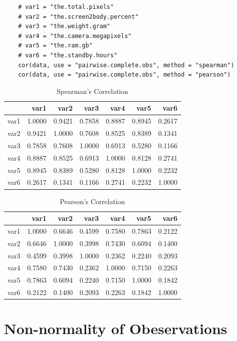 \documentclass[utf8,english]{gradu3}
\begin{document}
\begin{verbatim}
    # var1 = "the.total.pixels"
    # var2 = "the.screen2body.percent"
    # var3 = "the.weight.gram"
    # var4 = "the.camera.megapixels"
    # var5 = "the.ram.gb"
    # var6 = "the.standby.hours"
    cor(data, use = "pairwise.complete.obs", method = "spearman")
    cor(data, use = "pairwise.complete.obs", method = "pearson")
\end{verbatim}

\begin{table}[ht]
\caption{Spearman's Correlation}
\centering
\begin{tabular}{rrrrrrr}
  \hline
 & var1 & var2 & var3 & var4 & var5 & var6 \\ 
  \hline
var1 & 1.0000 & 0.9421 & 0.7858 & 0.8887 & 0.8945 & 0.2617 \\ 
  var2 & 0.9421 & 1.0000 & 0.7608 & 0.8525 & 0.8389 & 0.1341 \\ 
  var3 & 0.7858 & 0.7608 & 1.0000 & 0.6913 & 0.5280 & 0.1166 \\ 
  var4 & 0.8887 & 0.8525 & 0.6913 & 1.0000 & 0.8128 & 0.2741 \\ 
  var5 & 0.8945 & 0.8389 & 0.5280 & 0.8128 & 1.0000 & 0.2232 \\ 
  var6 & 0.2617 & 0.1341 & 0.1166 & 0.2741 & 0.2232 & 1.0000 \\ 
   \hline
\end{tabular}
\end{table}

\begin{table}[ht]
\caption{Pearson's Correlation}
\centering
\begin{tabular}{rrrrrrr}
  \hline
 & var1 & var2 & var3 & var4 & var5 & var6 \\ 
  \hline
var1 & 1.0000 & 0.6646 & 0.4599 & 0.7580 & 0.7863 & 0.2122 \\ 
  var2 & 0.6646 & 1.0000 & 0.3998 & 0.7430 & 0.6094 & 0.1400 \\ 
  var3 & 0.4599 & 0.3998 & 1.0000 & 0.2362 & 0.2240 & 0.2093 \\ 
  var4 & 0.7580 & 0.7430 & 0.2362 & 1.0000 & 0.7150 & 0.2263 \\ 
  var5 & 0.7863 & 0.6094 & 0.2240 & 0.7150 & 1.0000 & 0.1842 \\ 
  var6 & 0.2122 & 0.1400 & 0.2093 & 0.2263 & 0.1842 & 1.0000 \\ 
   \hline
\end{tabular}
\end{table}

\section{Non-normality of Obeservations}
\label{app:normality}
\end{document}
